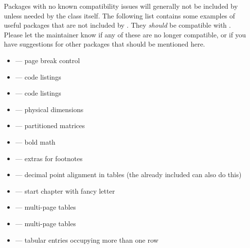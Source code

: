 Packages with no known compatibility issues will generally not be included by \rtthesis unless needed by the class itself.  The following list contains some examples of useful packages that are not included by \rtthesis.  They \emph{should} be compatible with \rtthesis.  Please let the \rtthesis maintainer know if any of these are no longer compatible, or if you have suggestions for other packages that should be mentioned here.
\begin{itemize}
  \item {} — page break control
  \item {} — code listings
  \item {} — code listings
  \item {} — physical dimensions
  \item {} — partitioned matrices
  \item {} — bold math
  \item {} — extras for footnotes
  \item {} — decimal point alignment in tables (the already included  can also do this)
  \item {} — start chapter with fancy letter
  \item {} — multi-page tables
  \item {} — multi-page tables
  \item {} — tabular entries occupying more than one row
\end{itemize}
